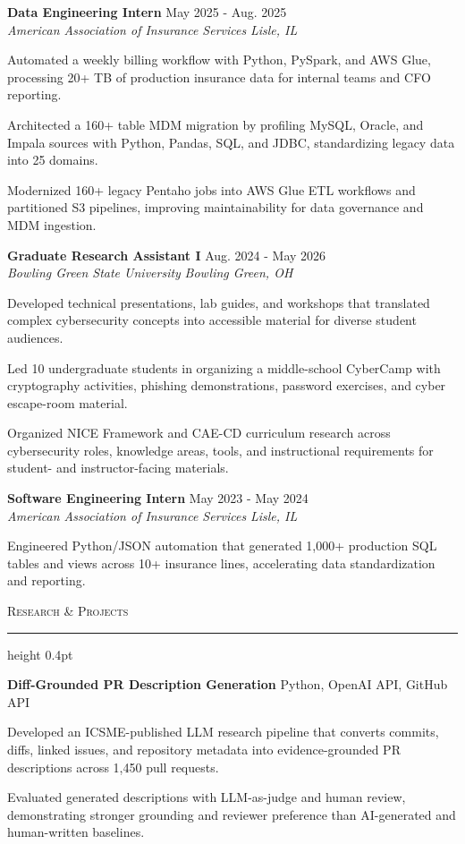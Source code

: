 \documentclass[letterpaper,11pt]{article}
\newcommand{\resumesection}[1]{%
  \par\vspace{2pt}%
  {\large\scshape #1}\par\vspace{2pt}%
  \hrule height 0.4pt\vspace{2pt}%
}
\newcommand{\resumeSubheading}[4]{
  \textbf{#1} \hfill #2\\
  \textit{#3} \hfill \textit{#4}
}
\newcommand{\projectHeading}[2]{
  \textbf{#1} \hfill #2
}
\begin{document}
\resumeSubheading
{Data Engineering Intern}{May 2025 - Aug. 2025}
{American Association of Insurance Services}{Lisle, IL}
\begin{tightitemize}
  \item Automated a weekly billing workflow with Python, PySpark, and AWS Glue, processing 20+ TB of production insurance data for internal teams and CFO reporting.
  \item Architected a 160+ table MDM migration by profiling MySQL, Oracle, and Impala sources with Python, Pandas, SQL, and JDBC, standardizing legacy data into 25 domains.
  \item Modernized 160+ legacy Pentaho jobs into AWS Glue ETL workflows and partitioned S3 pipelines, improving maintainability for data governance and MDM ingestion.
\end{tightitemize}

\resumeSubheading
{Graduate Research Assistant I}{Aug. 2024 - May 2026}
{Bowling Green State University}{Bowling Green, OH}
\begin{tightitemize}
  \item Developed technical presentations, lab guides, and workshops that translated complex cybersecurity concepts into accessible material for diverse student audiences.
  \item Led 10 undergraduate students in organizing a middle-school CyberCamp with cryptography activities, phishing demonstrations, password exercises, and cyber escape-room material.
  \item Organized NICE Framework and CAE-CD curriculum research across cybersecurity roles, knowledge areas, tools, and instructional requirements for student- and instructor-facing materials.
\end{tightitemize}

\resumeSubheading
{Software Engineering Intern}{May 2023 - May 2024}
{American Association of Insurance Services}{Lisle, IL}
\begin{tightitemize}
  \item Engineered Python/JSON automation that generated 1,000+ production SQL tables and views across 10+ insurance lines, accelerating data standardization and reporting.
\end{tightitemize}

\resumesection{Research \& Projects}
\projectHeading{Diff-Grounded PR Description Generation}{Python, OpenAI API, GitHub API}
\begin{tightitemize}
  \item Developed an ICSME-published LLM research pipeline that converts commits, diffs, linked issues, and repository metadata into evidence-grounded PR descriptions across 1,450 pull requests.
  \item Evaluated generated descriptions with LLM-as-judge and human review, demonstrating stronger grounding and reviewer preference than AI-generated and human-written baselines.
\end{tightitemize}
\end{document}
